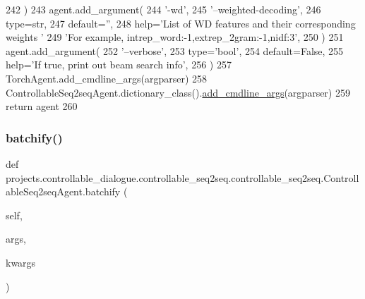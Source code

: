 \begin{DoxyCode}
242         )
243         agent.add\_argument(
244             \textcolor{stringliteral}{'-wd'},
245             \textcolor{stringliteral}{'--weighted-decoding'},
246             type=str,
247             default=\textcolor{stringliteral}{''},
248             help=\textcolor{stringliteral}{'List of WD features and their corresponding weights '}
249             \textcolor{stringliteral}{'For example, intrep\_word:-1,extrep\_2gram:-1,nidf:3'},
250         )
251         agent.add\_argument(
252             \textcolor{stringliteral}{'--verbose'},
253             type=\textcolor{stringliteral}{'bool'},
254             default=\textcolor{keyword}{False},
255             help=\textcolor{stringliteral}{'If true, print out beam search info'},
256         )
257         TorchAgent.add\_cmdline\_args(argparser)
258         ControllableSeq2seqAgent.dictionary\_class().\hyperlink{namespaceparlai_1_1agents_1_1drqa_1_1config_a62fdd5554f1da6be0cba185271058320}{add\_cmdline\_args}(argparser)
259         \textcolor{keywordflow}{return} agent
260 
\end{DoxyCode}
\mbox{\label{classprojects_1_1controllable__dialogue_1_1controllable__seq2seq_1_1controllable__seq2seq_1_1ControllableSeq2seqAgent_a9d31c040b479d9cfeaeecc19a98985ee}} 
\subsubsection{\texorpdfstring{batchify()}{batchify()}}
{\footnotesize\ttfamily def projects.\+controllable\+\_\+dialogue.\+controllable\+\_\+seq2seq.\+controllable\+\_\+seq2seq.\+Controllable\+Seq2seq\+Agent.\+batchify (\begin{DoxyParamCaption}\item[{}]{self,  }\item[{}]{args,  }\item[{}]{kwargs }\end{DoxyParamCaption})}

